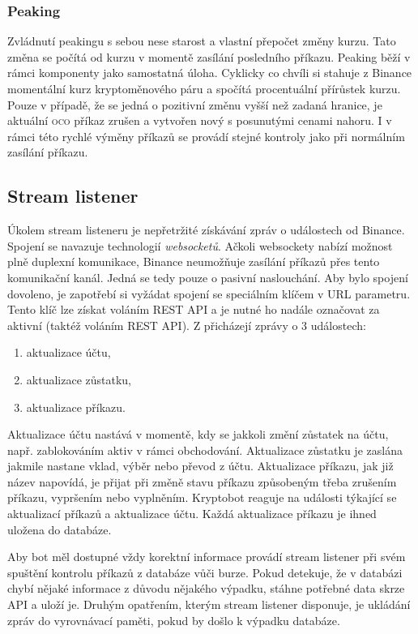 \subsubsection{Peaking}
Zvládnutí peakingu s sebou nese starost a vlastní přepočet změny kurzu. Tato změna se počítá od kurzu v momentě zasílání posledního příkazu. Peaking běží v rámci komponenty jako samostatná úloha.
Cyklicky co chvíli si stahuje z Binance momentální kurz kryptoměnového páru a spočítá procentuální přírůstek kurzu. Pouze v případě, že se jedná o pozitivní změnu vyšší než zadaná hranice, je
aktuální \textsc{oco} příkaz zrušen a vytvořen nový s posunutými cenami nahoru. I v rámci této rychlé výměny příkazů se provádí stejné kontroly jako při normálním zasílání příkazu.


\subsection{Stream listener}
Úkolem stream listeneru je nepřetržité získávání zpráv o událostech od Binance. Spojení se navazuje technologií \emph{websocketů}. Ačkoli websockety nabízí možnost plně duplexní komunikace, Binance
neumožňuje zasílání příkazů přes tento komunikační kanál. Jedná se tedy pouze o pasivní naslouchání. Aby bylo spojení dovoleno, je zapotřebí si vyžádat spojení se speciálním klíčem v URL parametru.
Tento klíč lze získat voláním REST API a je nutné ho nadále označovat za aktivní (taktéž voláním REST API). Z přicházejí zprávy o 3 událostech:
\begin{enumerate}
    \item aktualizace účtu,
    \item aktualizace zůstatku,
    \item aktualizace příkazu.
\end{enumerate}
Aktualizace účtu nastává v momentě, kdy se jakkoli změní zůstatek na účtu, např. zablokováním aktiv v rámci obchodování. Aktualizace zůstatku je zaslána jakmile nastane vklad, výběr nebo převod z účtu.
Aktualizace příkazu, jak již název napovídá, je přijat při změně stavu příkazu způsobeným třeba zrušením příkazu, vypršením nebo vyplněním. Kryptobot reaguje na události týkající se aktualizací příkazů
a aktualizace účtu. Každá aktualizace příkazu je ihned uložena do databáze.

Aby bot měl dostupné vždy korektní informace provádí stream listener při svém spuštění kontrolu příkazů z databáze vůči burze. Pokud detekuje, že v databázi chybí nějaké informace z důvodu nějakého výpadku,
stáhne potřebné data skrze API a uloží je. Druhým opatřením, kterým stream listener disponuje, je ukládání zpráv do vyrovnávací paměti, pokud by došlo k výpadku databáze.



